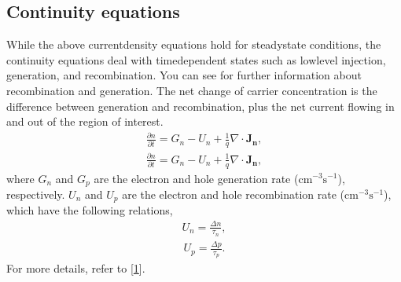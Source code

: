 \documentclass[letterpaper,10pt,english]{sphinxmanual}
\numberwithin{equation}{section}
\begin{document}
\subsection{Continuity equations}
\label{\detokenize{Basic_equation:continuity-equations}}
\sphinxAtStartPar
While the above current\sphinxhyphen{}density equations hold for steady\sphinxhyphen{}state conditions, the continuity equations deal with time\sphinxhyphen{}dependent states such as low\sphinxhyphen{}level injection, generation, and recombination.
You can see {\hyperref[\detokenize{Generation_and_recombination:generation-and-recombination}]{}} for further information about recombination and generation.
The net change of carrier concentration is the difference between generation and recombination, plus the net current flowing in and out of the region of interest.
\begin{equation}\label{equation:Basic_equation:electron_current_continuity}
\begin{split}\frac{\partial n}{\partial t} = G_n - U_n + \frac{1}{q}\nabla \cdot \mathbf{J_n},\end{split}
\end{equation}\begin{equation}\label{equation:Basic_equation:hole_current_continuity}
\begin{split}\frac{\partial n}{\partial t} = G_n - U_n + \frac{1}{q}\nabla \cdot \mathbf{J_n},\end{split}
\end{equation}
\sphinxAtStartPar
where \(G_n\) and \(G_p\) are the electron and hole generation rate (\(\mathrm{cm}^{-3}\mathrm{s}^{-1}\)), respectively.
\(U_n\) and \(U_p\) are the electron and hole recombination rate (\(\mathrm{cm}^{-3}\mathrm{s}^{-1}\)), which have the following relations,
\begin{equation}\label{equation:Basic_equation:electron_recombination_lifetime}
\begin{split}U_n = \frac{\Delta n}{\tau_n},\end{split}
\end{equation}\begin{equation}\label{equation:Basic_equation:hole_recombination_lifetime}
\begin{split}U_p = \frac{\Delta p}{\tau_p}.\end{split}
\end{equation}
\sphinxAtStartPar
For more details, refer to {[}\hyperlink{cite.Basic_equation:id3}{1}{]}.
\end{document}
